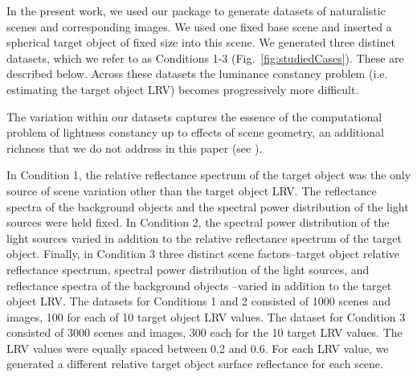 \documentclass{jov}
\begin{document}
In the present work, we used our package to generate datasets of naturalistic scenes and corresponding images.
We used one fixed base scene and inserted a spherical target object of fixed size into this scene.
We generated three distinct datasets, which we refer to as Conditions 1-3 (Fig.~\ref{fig:studiedCases}). These are described below.
Across these datasets the luminance constancy problem (i.e. estimating the target object LRV)
becomes progressively more difficult.

The variation within our datasets captures the essence of the computational problem of lightness constancy
up to effects of scene geometry, an additional richness that we do not address in this paper (see ).

In Condition 1, the relative reflectance spectrum of the target object was the only source of scene variation other than the target object LRV.
The reflectance spectra of the background objects and the spectral power distribution of the light sources were held fixed.
In Condition 2, the spectral power distribution of the light sources varied in addition to the relative reflectance spectrum of the target object.
Finally, in Condition 3 three distinct scene factors--target object relative reflectance spectrum, spectral power distribution of the light sources, and reflectance spectra of the background objects
--varied in addition to the target object LRV.
The datasets for Conditions 1 and 2 consisted of 1000 scenes and images, 100 for each of 10 target object LRV values. 
The dataset for Condition 3 consisted of 3000 scenes and images, 300 each for the 10 target LRV values.
The LRV values were equally spaced between 0.2 and 0.6.
For each LRV value, we generated a different relative target object surface reflectance for each scene. 
\end{document}
